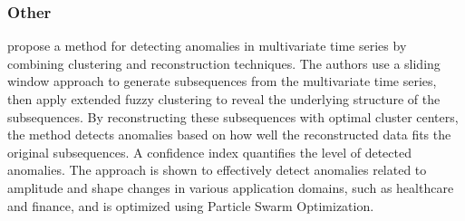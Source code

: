 \subsubsection{Other}
 propose a method for detecting anomalies in multivariate time series by combining clustering and reconstruction techniques. The authors use a sliding window approach to generate subsequences from the multivariate time series, then apply extended fuzzy clustering to reveal the underlying structure of the subsequences. By reconstructing these subsequences with optimal cluster centers, the method detects anomalies based on how well the reconstructed data fits the original subsequences. A confidence index quantifies the level of detected anomalies. The approach is shown to effectively detect anomalies related to amplitude and shape changes in various application domains, such as healthcare and finance, and is optimized using Particle Swarm Optimization.


